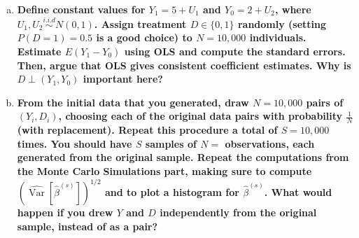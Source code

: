 \documentclass{article}
\begin{document}
\begin{enumerate}[(a), wide, labelwidth=!, labelindent=0pt]
\item \textbf{Define constant values for $Y_{1}=5+U_{1}$ and $Y_{0}=2+U_{2}$, where $U_{1}, U_{2} \stackrel{i . i . d}{\sim} N(0,1)$. Assign treatment $D \in\{0,1\}$ randomly (setting $P(D=1)=0.5$ is a good choice) to $N=10,000$ individuals. Estimate $E\left(Y_{1}-Y_{0}\right)$ using OLS and compute the standard errors. Then, argue that OLS gives consistent coefficient estimates. Why is $D \perp\left(Y_{1}, Y_{0}\right)$ important here?}
\item \textbf{From the initial data that you generated, draw $N=10,000$ pairs of $\left(Y_{i}, D_{i}\right)$, choosing each of the original data pairs with probability $\frac{1}{N}$ (with replacement). Repeat this procedure a total of $S=10,000$ times. You should have $S$ samples of $N=$ observations, each generated from the original sample. Repeat the computations from the Monte Carlo Simulations part, making sure to compute $\left(\widehat{\operatorname{Var}}\left[\hat{\beta}^{(s)}\right]\right)^{1 / 2}$ and to plot a histogram for $\hat{\beta}^{(s)}$. What would happen if you drew $Y$ and $D$ independently from the original sample, instead of as a pair?}
\end{enumerate}
\end{document}

